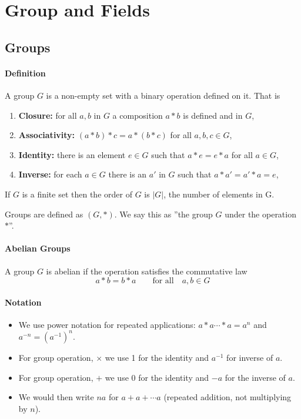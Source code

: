 \section{Group and Fields}
\subsection{Groups}

\paragraph{Definition}
A group \(G\) is a non-empty set with a binary operation defined on it. That is
\begin{enumerate}
    \item \textbf{Closure:} for all \(a,b\) in \(G\) a composition \(a * b\) is defined and in \(G\),
    \item \textbf{Associativity:} \((a * b) * c = a * (b * c)\) for all \(a,b,c \in G\),
    \item \textbf{Identity:} there is an element \(e\in G\) such that \(a * e = e * a\) for all \(a \in G\),
    \item \textbf{Inverse:} for each \(a \in G\) there is an \(a'\) in \(G\) such that \(a * a' = a' * a = e\),
\end{enumerate}
If \(G\) is a finite set then the order of \(G\) is \(|G|\), the number of elements in G.

Groups are defined as \((G, *)\). We say this as ''the group \(G\) under the operation \(*\)''.

\paragraph{Abelian Groups}
A group \(G\) is abelian if the operation satisfies the commutative law
\[a * b = b * a \qquad \text{for all} \quad a,b \in G\]

\paragraph{Notation}
\begin{itemize}
    \item We use power notation for repeated applications: \(a * a \cdots * a = a^n\) and \(a^{-n} = (a^{-1})^n\).
    \item For group operation, \(\times\) we use 1 for the identity and \(a^{-1}\) for inverse of \(a\).
    \item For group operation, \(+\) we use 0 for the identity and \(-a\) for the inverse of \(a\).
    \item We would then write \(na\) for \(a+a+\cdots a\) (repeated addition, not multiplying by \(n\)).
\end{itemize}

